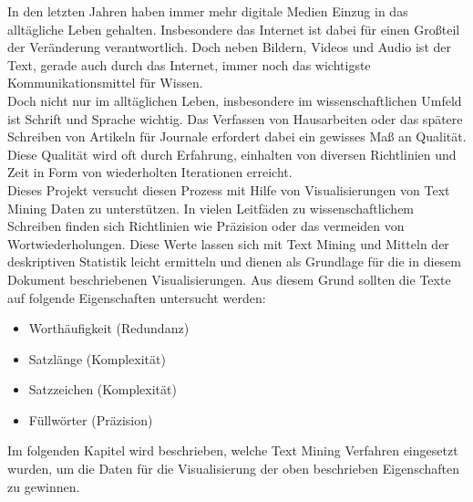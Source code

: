 

\maketitle

In den letzten Jahren haben immer mehr digitale Medien Einzug in das alltägliche Leben gehalten. Insbesondere das Internet ist dabei für einen Großteil der Veränderung verantwortlich. Doch neben Bildern, Videos und Audio ist der Text, gerade auch durch das Internet, immer noch das wichtigste Kommunikationsmittel für Wissen.\\

Doch nicht nur im alltäglichen Leben, insbesondere im wissenschaftlichen Umfeld ist Schrift und Sprache wichtig. Das Verfassen von Hausarbeiten oder das spätere Schreiben von Artikeln für Journale erfordert dabei ein gewisses Maß an Qualität. Diese Qualität wird oft durch Erfahrung, einhalten von diversen Richtlinien und Zeit in Form von wiederholten Iterationen erreicht.\\

Dieses Projekt versucht diesen Prozess mit Hilfe von Visualisierungen von Text Mining Daten zu unterstützen. In vielen Leitfäden zu wissenschaftlichem Schreiben finden sich Richtlinien wie Präzision oder das vermeiden von Wortwiederholungen. Diese Werte lassen sich mit Text Mining und Mitteln der deskriptiven Statistik leicht ermitteln und dienen als Grundlage für die in diesem Dokument beschriebenen Visualisierungen. Aus diesem Grund sollten die Texte auf folgende Eigenschaften untersucht werden:\\

\begin{itemize}
\item Worthäufigkeit (Redundanz)
\item Satzlänge (Komplexität)
\item Satzzeichen (Komplexität)
\item Füllwörter (Präzision)
\end{itemize}

Im folgenden Kapitel wird beschrieben, welche Text Mining Verfahren eingesetzt wurden, um die Daten für die Visualisierung der oben beschrieben Eigenschaften zu gewinnen.
